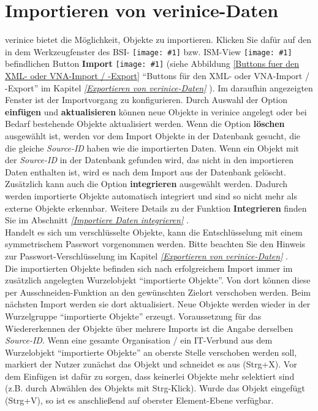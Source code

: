 \documentclass[a4paper,10pt]{book}
\newcommand{\icon}[1]{\texttt{[image: \#1]}}
\begin{document}
\section{Importieren von verinice-Daten}
verinice bietet die Möglichkeit, Objekte zu importieren. Klicken Sie dafür auf den in dem Werkzeugfenster des BSI-
\icon{Icon/GS_Modell.png} bzw. ISM-View \icon{Icon/Informationssicherheitsmodell.png}
befindlichen Button \textbf{Import} \icon{Icon/Import.png} (siehe Abbildung \ref{Buttons fuer den XML- oder VNA-Import / -Export} ``Buttons für den XML- oder VNA-Import / -Export''
im Kapitel {\em \ref{Exportieren von verinice-Daten} }). Im daraufhin angezeigten Fenster ist der Importvorgang zu konfigurieren. Durch Auswahl der Option
\textbf{einfügen} und \textbf{aktualisieren}  können neue Objekte in verinice angelegt oder bei Bedarf bestehende Objekte aktualisiert werden. Wenn die Option
\textbf{löschen} ausgewählt ist, werden vor dem Import Objekte in der Datenbank gesucht, die die gleiche \textit{Source-ID} haben wie die importierten Daten. Wenn ein Objekt mit der \textit{Source-ID} in der Datenbank gefunden wird, das nicht in den importieren Daten enthalten ist, wird es nach dem Import aus der Datenbank gelöscht.
Zusätzlich kann auch die Option \textbf{integrieren} ausgewählt werden. Dadurch werden importierte Objekte automatisch integriert und sind so
nicht mehr als externe Objekte erkennbar. Weitere Details zu der Funktion \textbf{Integrieren} finden Sie im Abschnitt {\em \ref{Importiere Daten integrieren} }.
\newline\\
Handelt es sich um verschlüsselte Objekte, kann die Entschlüsselung mit einem symmetrischem Passwort vorgenommen werden. Bitte beachten Sie den Hinweis
zur Passwort-Verschlüsselung im Kapitel {\em \ref{Exportieren von
verinice-Daten} }. \newline\\
Die importierten Objekte befinden sich nach erfolgreichem Import immer im zusätzlich angelegten Wurzelobjekt ``importierte Objekte''. Von dort
können diese per Ausschneiden-Funktion an den gewünschten Zielort verschoben werden. Beim nächsten Import werden sie dort aktualisiert.
Neue Objekte werden wieder in der Wurzelgruppe ``importierte Objekte'' erzeugt. Voraussetzung für das Wiedererkennen der Objekte über mehrere Imports ist die Angabe derselben \textit{Source-ID}.
\newline
Wenn eine gesamte Organisation / ein IT-Verbund aus dem Wurzelobjekt ``importierte Objekte'' an oberste Stelle verschoben werden soll, markiert der Nutzer zunächst das
Objekt und schneidet es aus (Strg+X). Vor dem Einfügen ist dafür zu sorgen, dass keinerlei Objekte mehr selektiert sind (z.B. durch Abwählen des
Objekts mit Strg-Klick). Wurde das Objekt eingefügt (Strg+V), so ist es anschließend auf oberster Element-Ebene verfügbar.
\end{document}
